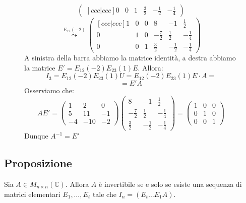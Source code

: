 \documentclass[a4paper]{article}
\theoremstyle{break}
\theoremstyle{break}
\theoremstyle{break}
\theoremstyle{break}
\begin{document}
\begin{figure}[H]
\begin{example}
\[\begin{pmatrix}[ccc|ccc]
       0 & 0 & 1 & \frac{3}{2} & -\frac{1}{2} & -\frac{1}{4}
     \end{pmatrix} 
   \] 
   \[
     \stackrel{E_{12}(-2)}{\leadsto}
     \begin{pmatrix}[ccc|ccc]
       1 & 0 & 0 & 8 & -1 & \frac{1}{2}\\
       0 & 1 & 0 & -\frac{7}{2} & \frac{1}{2} & -\frac{1}{4}\\
       0 & 0 & 1 & \frac{3}{2} & -\frac{1}{2} & -\frac{1}{4}
     \end{pmatrix} 
   \] 
   A sinistra della barra abbiamo la matrice identità, a destra abbiamo la matrice 
   \( E' = E_{12}(-2)E_{23}(1)E \). Allora:
   \[
     I_3 = E_{12}(-2)E_{23}(1)U = E_{12}(-2)E_{23}(1)E \cdot A =
   \] 
   \[
     = E'A
   \] 
   Osserviamo che:
   \[
   AE' = \begin{pmatrix} 
     1 & 2 & 0\\
     5 & 11 & -1\\
     -4 & -10 & -2
   \end{pmatrix} 
   \begin{pmatrix} 
     8 & -1 & \frac{1}{2}\\
     -\frac{7}{2} & \frac{1}{2} & -\frac{1}{4}\\
     \frac{3}{2} & -\frac{1}{2} & -\frac{1}{4}
   \end{pmatrix} 
   =
   \begin{pmatrix} 
     1 & 0 & 0\\
     0 & 1 & 0\\
     0 & 0 & 1
   \end{pmatrix} 
   \] 
   Dunque \( A^{-1}=E' \) 
  \end{example}
\end{figure}

\subsection{Proposizione}
Sia \( A \in M_{n \times n}(\mathbb{C}) \). Allora \( A \) è invertibile se e solo se
esiste una sequenza di matrici elementari \( E_1, \ldots, E_t \) tale che \( I_n = 
(E_t \ldots E_1 A) \).
\end{document}

